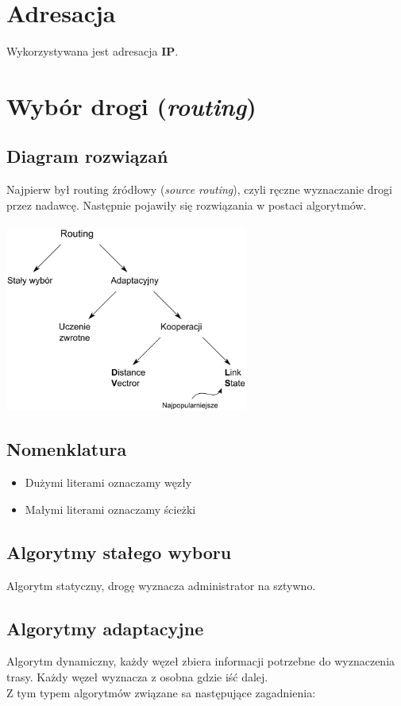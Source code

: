 \documentclass[a4paper,twoside]{article}
\begin{document}
	\section{Adresacja}
		Wykorzystywana jest adresacja \textbf{IP}.
	\section{Wybór drogi (\emph{routing})}
		\subsection{Diagram rozwiązań}
			Najpierw był routing źródłowy (\emph{source routing}), czyli ręczne wyznaczanie drogi przez nadawcę. Następnie pojawiły się rozwiązania w postaci algorytmów.\\\\
			\includegraphics[width=8cm]{./images/image35.pdf}
		\subsection{Nomenklatura}
		\begin{itemize}
			\item Dużymi literami oznaczamy węzły
			\item Małymi literami oznaczamy ścieżki
		\end{itemize}
		\subsection{Algorytmy stałego wyboru}
			Algorytm statyczny, drogę wyznacza administrator na sztywno.
		\subsection{Algorytmy adaptacyjne}
			Algorytm dynamiczny, każdy węzeł zbiera informacji potrzebne do wyznaczenia trasy. Każdy węzeł wyznacza z osobna gdzie iść dalej.\\
			Z tym typem algorytmów związane sa następujące zagadnienia:
\end{document}
